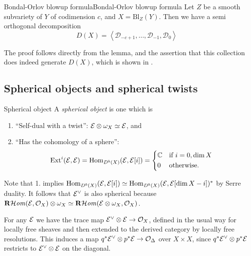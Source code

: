 \begin{theorem}{Bondal-Orlov blowup formula}{Bondal-Orlov blowup formula}
    Let $Z$ be a smooth subvariety of $Y$ of codimension $c$, and $X = \mathrm{Bl}_{Z}(Y)$. Then we have a semi orthogonal decomposition $$ D(X) = \left< \mathcal{D}_{-c+1},\dots,\mathcal{D}_{-1}, \mathcal{D}_0 \right> $$
\end{theorem}

The proof follows directly from the lemma, and the assertion that this collection does indeed generate $D(X)$, which is shown in \cite{orlov_projective_1993}.

\subsection{Spherical objects and spherical twists}

\begin{definition}{Spherical object}{}
    A \emph{spherical object} is one which is
    \begin{enumerate}
        \item ``Self-dual with a twist'': $\mathcal{E}\otimes\omega_X\simeq\mathcal{E}$, and
        \item ``Has the cohomology of a sphere'':
            \begin{equation*}
                \Ext^i(\calE,\calE)
                    = \Hom_{D^b(X)}(\calE,\calE[i])
                    = \begin{cases*}
                        \C & if $i=0,\dim X$ \\
                        0 & otherwise.
                    \end{cases*}
            \end{equation*}
    \end{enumerate}
\end{definition}

Note that 1. implies $\operatorname{Hom}_{D^b(X)}(\mathcal{E},\mathcal{E}[i])\simeq\operatorname{Hom}_{D^b(X)}(\mathcal{E},\mathcal{E}[\dim X-i])^*$
by Serre duality. It follows that $\mathcal{E}^\vee$ is also spherical because
$\operatorname{\mathbf{R}\mathcal{H}\mathit{om}}(\mathcal{E},\mathcal{O}_X)\otimes\omega_X\simeq\operatorname{\mathbf{R}\mathcal{H}\mathit{om}}(\mathcal{E}\otimes\omega_X,\mathcal{O}_X)$.

For any $\mathcal{E}$ we have the trace map $\mathcal{E}^\vee\otimes\mathcal{E}\to\mathcal{O}_X$, defined
in the usual way for locally free sheaves and then extended to the derived
category by locally free resolutions. This induces a map
$q^*\mathcal{E}^\vee\otimes p^*\mathcal{E}\to\mathcal{O}_\Delta$ over $X\times X$, since
$q^*\mathcal{E}^\vee\otimes p^*\mathcal{E}$ restricts to $\mathcal{E}^\vee\otimes\mathcal{E}$ on the
diagonal.

